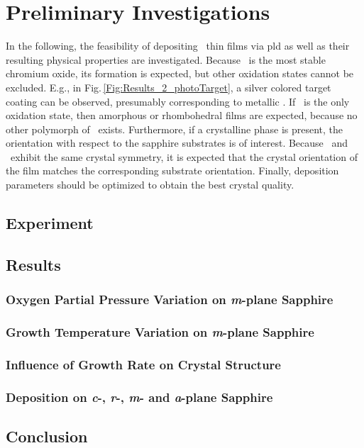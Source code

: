 \section{Preliminary Investigations}
    \label{Sec:Results_Preliminary}
In the following, the feasibility of depositing \cro\ thin films via \gls{pld} as well as their resulting physical properties are investigated.
Because \cro\ is the most stable chromium oxide, its formation is expected, but other oxidation states cannot be excluded.
E.g., in Fig.\,\ref{Fig:Results_2_photoTarget}, a silver colored target coating can be observed, presumably corresponding to metallic .
If \cro\ is the only oxidation state, then amorphous or rhombohedral films are expected, because no other polymorph of \cro\ exists.
Furthermore, if a crystalline phase is present, the orientation with respect to the sapphire substrates is of interest.
Because \alo\ and \cro\ exhibit the same crystal symmetry, it is expected that the crystal orientation of the film  matches the corresponding substrate orientation.
Finally, deposition parameters should be optimized to obtain the best crystal quality.

\subsection{Experiment}
    

\subsection{Results}
    \subsubsection{Oxygen Partial Pressure Variation on \textit{m}-plane Sapphire}
        
    \subsubsection{Growth Temperature Variation on \textit{m}-plane Sapphire}
        
    \subsubsection{Influence of Growth Rate on Crystal Structure}
        
    \subsubsection{Deposition on \textit{c}-, \textit{r}-, \textit{m}- and \textit{a}-plane Sapphire}
        

\subsection{Conclusion}
    